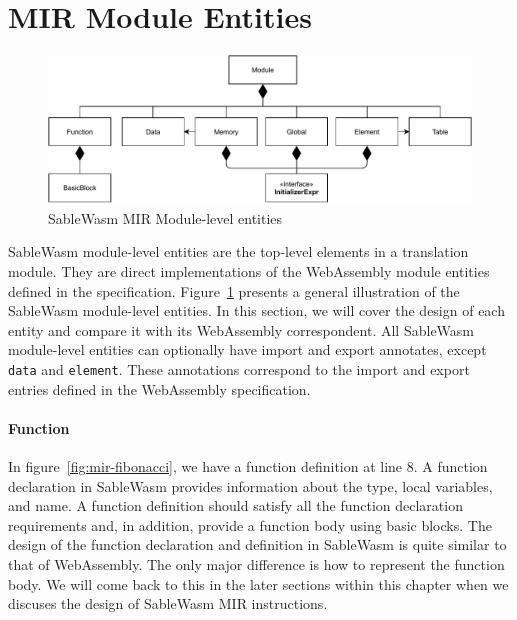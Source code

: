 \section{MIR Module Entities}
\label{section:mir-design-module-entities}

\begin{figure}
  \centering
  \includegraphics[width=\textwidth]{Images/4.MIR/module.pdf}
  \caption{SableWasm MIR Module-level entities}
  \label{fig:sablewasm-mir-module}
\end{figure}

SableWasm module-level entities are the top-level elements in a translation
module. They are direct implementations of the WebAssembly module entities
defined in the specification. Figure~\ref{fig:sablewasm-mir-module} presents a
general illustration of the SableWasm module-level entities. In this section,
we will cover the design of each entity and compare it with its WebAssembly
correspondent. All SableWasm module-level entities can optionally have import
and export annotates, except \texttt{data} and \texttt{element}. These
annotations correspond to the import and export entries defined in the
WebAssembly specification.

\paragraph{Function}
In figure~\ref{fig:mir-fibonacci}, we have a function definition at line 8. A
function declaration in SableWasm provides information about the type, local
variables, and name. A function definition should satisfy all the function
declaration requirements and, in addition, provide a function body using basic
blocks. The design of the function declaration and definition in SableWasm is
quite similar to that of WebAssembly. The only major difference is how to
represent the function body. We will come back to this in the later sections
within this chapter when we discuses the design of SableWasm MIR instructions.

